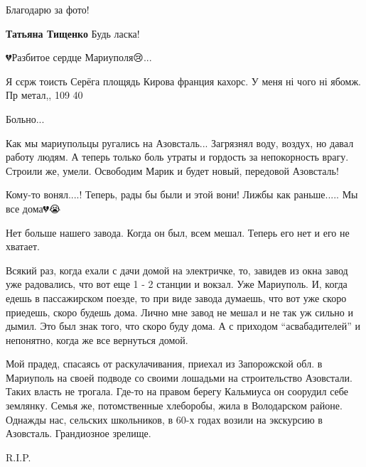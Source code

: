 Благодарю за фото!

\begin{itemize} %
\textbf{Татьяна Тищенко} Будь ласка!
\end{itemize} %


💔Разбитое сердце Мариуполя😢...


Я сєрж тоисть Серёга площядь Кирова франция кахорс. У меня ні чого ні ябомж. Пр
метал,, 109 40


Больно...


Как мы мариупольцы ругались на Азовсталь... Загрязнял воду, воздух, но давал
работу людям. А теперь только боль утраты и гордость за непокорность врагу.
Строили же, умели. Освободим Марик и будет новый, передовой Азовсталь!


Кому-то вонял....! Теперь, рады бы были и этой вони! Лижбы как раньше..... Мы
все дома💔😭


Нет больше нашего завода. Когда он был, всем мешал. Теперь его нет и его не
хватает.


Всякий раз, когда ехали с дачи домой на электричке, то, завидев из окна завод
уже радовались, что вот еще 1 - 2 станции и вокзал. Уже Мариуполь. И, когда
едешь в пассажирском поезде, то при виде завода думаешь, что вот уже скоро
приедешь, скоро будешь дома. Лично мне завод не мешал и не так уж сильно и
дымил. Это был знак того, что скоро буду дома. А с приходом \enquote{асвабадителей} и
непонятно, когда же все вернуться домой.


Мой прадед, спасаясь от раскулачивания, приехал из Запорожской обл. в Мариуполь на
своей подводе со своими лошадьми на строительство Азовстали. Таких власть не
трогала. Где-то на правом берегу Кальмиуса он соорудил себе землянку. Семья
же, потомственные хлеборобы, жила в Володарском районе. Однажды нас, сельских
школьников, в 60-х годах возили на экскурсию в Азовсталь. Грандиозное зрелище.


R.I.P.


